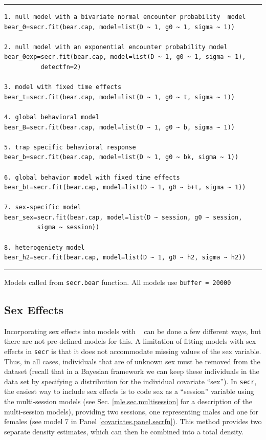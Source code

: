 \begin{panel}[htp]
\centering
\rule[0.1in]{\textwidth}{.03in}
{\small
\begin{verbatim}
1. null model with a bivariate normal encounter probability  model
bear_0=secr.fit(bear.cap, model=list(D ~ 1, g0 ~ 1, sigma ~ 1))

2. null model with an exponential encounter probability model
bear_0exp=secr.fit(bear.cap, model=list(D ~ 1, g0 ~ 1, sigma ~ 1),
          detectfn=2)

3. model with fixed time effects
bear_t=secr.fit(bear.cap, model=list(D ~ 1, g0 ~ t, sigma ~ 1))

4. global behavioral model
bear_B=secr.fit(bear.cap, model=list(D ~ 1, g0 ~ b, sigma ~ 1))

5. trap specific behavioral response
bear_b=secr.fit(bear.cap, model=list(D ~ 1, g0 ~ bk, sigma ~ 1))

6. global behavior model with fixed time effects
bear_bt=secr.fit(bear.cap, model=list(D ~ 1, g0 ~ b+t, sigma ~ 1))

7. sex-specific model
bear_sex=secr.fit(bear.cap, model=list(D ~ session, g0 ~ session, 
         sigma ~ session))

8. heterogeniety model
bear_h2=secr.fit(bear.cap, model=list(D ~ 1, g0 ~ h2, sigma ~ h2))
\end{verbatim}
}

\rule[-0.1in]{\textwidth}{.03in}
\caption{
Models called from \mbox{\tt secr.bear} function. All models use \mbox{\tt buffer = 20000}}
\label{covariates.panel.secrfn}
\end{panel}


\subsection{Sex Effects}
\label{covariates.secr.sex}

Incorporating sex effects into
models with \secr~ can be done a few different ways, but there are not
pre-defined models for this.  A limitation of fitting models with sex
effects in \mbox{\tt secr} is that it does not accommodate missing
values of the sex variable. Thus, in all cases,
individuals that are of unknown sex must be removed from the dataset
(recall that in a Bayesian framework we can keep these individuals in
the data set by specifying a distribution for the individual covariate
``sex'').
In \mbox{\tt secr}, the easiest way to include sex effects is 
to code sex as a  ``session'' variable using the multi-session models
(see Sec. \ref{mle.sec.multisession} for a description
of the multi-session models), providing two sessions, one representing
males and one for females (see model 7 in Panel
\ref{covariates.panel.secrfn}).  This method provides two separate
density estimates, which can then be combined into a total density.

